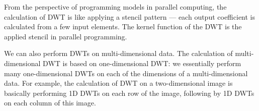 From the perspective of programming models in parallel computing, 
the calculation of DWT is like applying a stencil pattern --- 
each output coefficient is calculated from a few input elements. 
%
The kernel function of the DWT is the applied stencil in parallel programming.


We can also perform DWTs on multi-dimensional data.
%
The calculation of multi-dimensional DWT is based on one-dimensional DWT:
we essentially perform many one-dimensional DWTs on each of the dimensions
of a multi-dimensional data.
%
For example, the calculation of DWT on a two-dimensional image is basically 
performing 1D DWTs on each row of the image, following by 1D DWTs on 
each column of this image.



